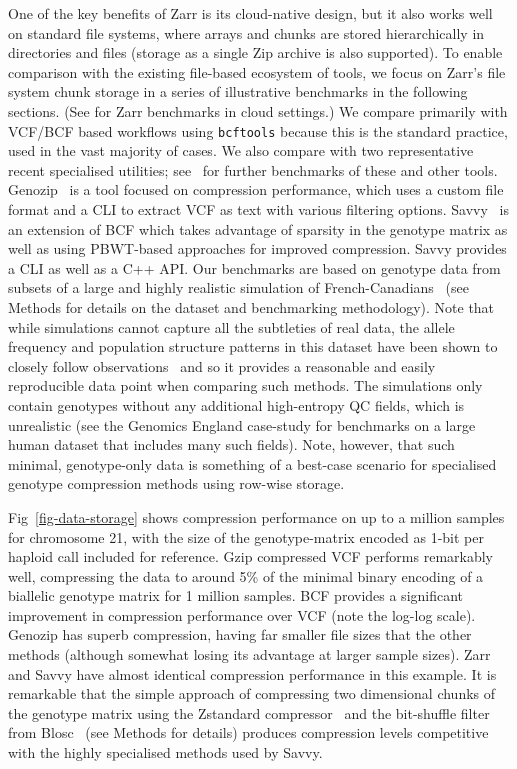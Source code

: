 \documentclass[a4paper,num-refs]{oup-contemporary}
\begin{document}
One of the key benefits of Zarr is its cloud-native design, 
but it also works well on standard file systems, where 
arrays and chunks are stored hierarchically in directories
and files (storage as a single Zip archive is also supported).
To enable comparison with the existing file-based ecosystem
of tools, we focus on Zarr's file system chunk storage in a series of illustrative 
benchmarks in the following sections. 
(See \citep{durbin2020task,moore2021ome,gowan2022using} for Zarr
benchmarks in cloud settings.)
We compare primarily with
VCF/BCF based workflows using \texttt{bcftools} because this
is the standard practice, used in the vast majority of cases.
We also compare with two representative recent specialised utilities;
see~\cite{danek2018gtc,zhang2023gbc} for further benchmarks of 
these and other tools.
Genozip~\cite{lan2020genozip,lan2021genozip} is a tool focused 
on compression performance, which uses a custom file format 
and a CLI to extract VCF as text with various filtering options.
Savvy~\cite{lefaive2021sparse} is an extension of BCF which 
takes advantage of sparsity in the genotype matrix as well
as using PBWT-based approaches for improved compression.
Savvy provides a CLI as well as a C++ API.
Our benchmarks are based on genotype data 
from subsets of a large and highly realistic 
simulation of French-Canadians~\cite{anderson2023on}
(see Methods for details on the dataset and benchmarking methodology).
Note that while simulations cannot capture 
all the subtleties of real data, the allele frequency
and population structure patterns in this dataset 
have been shown to closely follow 
observations~\cite{anderson2023on} and so it provides 
a reasonable and easily reproducible data point 
when comparing such methods.
The simulations only contain genotypes without any additional
high-entropy QC fields, which is unrealistic 
(see the Genomics England case-study
for benchmarks on a large human dataset that includes 
many such fields). 
Note, however, that such minimal, genotype-only data 
is something of a best-case scenario for specialised genotype
compression methods using row-wise storage.

Fig~\ref{fig-data-storage} shows compression performance 
on up to a million samples for chromosome 21, with 
the size of the genotype-matrix encoded as 1-bit per haploid
call included for reference.
Gzip compressed VCF performs remarkably well, compressing 
the data to around 5\% of the 
minimal binary encoding of a biallelic genotype matrix
for 1 million samples. 
BCF provides a significant improvement in compression
performance over VCF (note the log-log scale). Genozip has 
superb compression, having far smaller file sizes that the 
other methods (although somewhat losing its advantage at 
larger sample sizes). Zarr and Savvy have 
almost identical compression performance in this example.
It is remarkable that the simple approach of compressing
two dimensional chunks of the genotype matrix 
using the Zstandard compressor~\citep{collet2021rfc} and the 
bit-shuffle filter from Blosc~\cite{alted2010modern} 
(see Methods for details) produces 
compression levels competitive with the highly specialised methods
used by Savvy.
\end{document}
